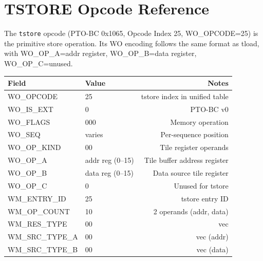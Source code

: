 \clearpage

\section{TSTORE Opcode Reference}

The \texttt{tstore} opcode (PTO-BC 0x1065, Opcode Index 25, WO\_OPCODE=25) is the primitive store operation. Its WO encoding follows the same format as tload, with WO\_OP\_A=addr register, WO\_OP\_B=data register, WO\_OP\_C=unused.

\begin{center}
\begin{tabular}{llr}
\toprule
Field & Value & Notes \\
\midrule
WO\_OPCODE & 25 & tstore index in unified table \\
WO\_IS\_EXT & 0 & PTO-BC v0 \\
WO\_FLAGS & 000 & Memory operation \\
WO\_SEQ & varies & Per-sequence position \\
WO\_OP\_KIND & 00 & Tile register operands \\
WO\_OP\_A & addr reg (0--15) & Tile buffer address register \\
WO\_OP\_B & data reg (0--15) & Data source tile register \\
WO\_OP\_C & 0 & Unused for tstore \\
WM\_ENTRY\_ID & 25 & tstore entry ID \\
WM\_OP\_COUNT & 10 & 2 operands (addr, data) \\
WM\_RES\_TYPE & 00 & vec \\
WM\_SRC\_TYPE\_A & 00 & vec (addr) \\
WM\_SRC\_TYPE\_B & 00 & vec (data) \\
\bottomrule
\end{tabular}
\end{center}
